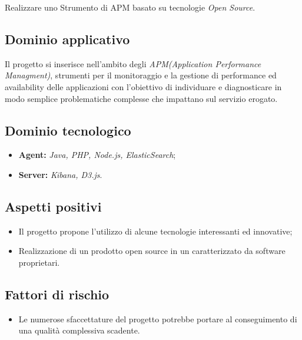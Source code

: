 \documentclass[openany,12pt,a4paper]{report}
\begin{document}
	Realizzare uno Strumento di APM basato su tecnologie \textit{Open Source}.

	\subsection{Dominio applicativo}

	Il progetto si inserisce nell'ambito degli \textit{APM(Application Performance Managment)}, strumenti per il monitoraggio e la gestione di performance ed availability delle applicazioni con l’obiettivo di individuare e diagnosticare in modo semplice problematiche complesse che impattano sul servizio erogato.

	\subsection{Dominio tecnologico}

	\begin{itemize}
		\item \textbf{Agent:} \textit{Java, PHP, Node.js, ElasticSearch};

		\item \textbf{Server:} \textit{Kibana, D3.js}.
	\end{itemize}

	\subsection{Aspetti positivi}

	\begin{itemize}
		\item Il progetto propone l'utilizzo di alcune tecnologie interessanti ed innovative;

		\item Realizzazione di un prodotto open source in un  caratterizzato da software proprietari.
	\end{itemize}

	\subsection{Fattori di rischio}

	\begin{itemize}
		\item Le numerose sfaccettature del progetto potrebbe portare al conseguimento di una qualità complessiva scadente.
	\end{itemize}
\end{document}
